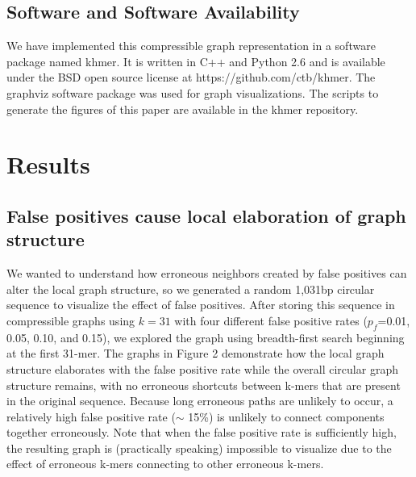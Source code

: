 \documentclass[12pt]{article} \usepackage{simplemargins}
\begin{document}

\subsection{Software and Software Availability}

We have implemented this compressible graph representation in a
software package named khmer.  It is written in C++ and Python 2.6 and
is available under the BSD open source license at
https://github.com/ctb/khmer.  The graphviz software package was used
for graph visualizations. The scripts to generate the figures of this
paper are available in the khmer repository.

\section{Results}

\subsection{False positives cause local elaboration of graph structure}

We wanted to understand how erroneous neighbors created by false
positives can alter the local graph structure, so we 
generated a random 1,031bp circular sequence to visualize the effect of false
positives.  After storing this sequence in compressible graphs using
$k=31$ with four different false positive rates ($p_f$=0.01, 0.05,
0.10, and 0.15), we explored the graph using breadth-first search
beginning at the first 31-mer.  The graphs in Figure 2 demonstrate how
the local graph structure elaborates with the false positive rate
while the overall circular graph structure remains, with no erroneous
shortcuts between k-mers that are present in the original
sequence. Because long erroneous paths are unlikely to occur, a
relatively high false positive rate ($\sim$ 15\%) is unlikely to
connect components together erroneously. Note that when the false
positive rate is sufficiently high, the resulting graph is
(practically speaking) impossible to visualize due to the effect of
erroneous k-mers connecting to other erroneous k-mers.

\end{document}
